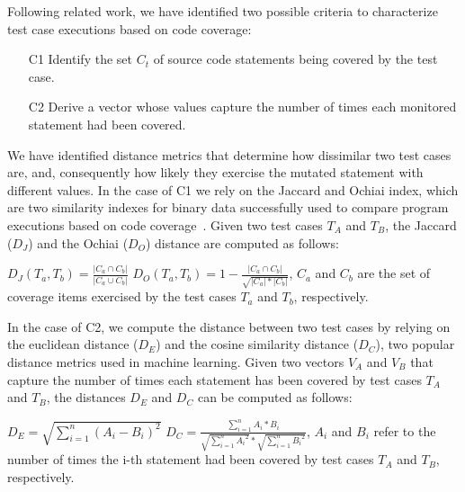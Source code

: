 Following related work, we have identified two possible criteria to characterize test case executions based on code coverage:
\begin{itemize}
\item[C1] Identify the set $C_t$ of source code statements being covered by the test case.
\item[C2] Derive a vector whose values capture the number of times each monitored statement had been covered.
\end{itemize}

We have identified distance metrics that determine how dissimilar two test cases are, and, consequently how likely they exercise the mutated statement with different values. In the case of C1 we rely on the Jaccard and Ochiai index, which are two similarity indexes for binary data successfully used to compare program executions based on code coverage~\cite{Zou:Ochiai:2019,Keller:Jaccard:2017,Briand:2019}. Given two test cases $T_A$ and $T_B$, the Jaccard  ($D_J$) and the Ochiai ($D_O$) distance are computed as follows:

$D_J(T_a,T_b)=\frac{|C_a \cap C_b|}{|C_a \cup C_b|}$ \hspace{5mm} $D_O(T_a,T_b)=1-\frac{|C_a \cap C_b|}{\sqrt{|C_a| * |C_b|}}$, 
$C_a$ and $C_b$ are the set of coverage items exercised by the test cases $T_a$ and $T_b$, respectively.

In the case of C2, we compute the distance between two test cases by relying on the euclidean distance ($D_E$) and the cosine similarity distance ($D_C$), two popular distance metrics used in machine learning. Given two vectors $V_A$ and $V_B$ that capture the number of times each statement has been covered by test cases $T_A$ and $T_B$, the distances $D_E$ and $D_C$ can be computed as follows:

$D_E=\sqrt{\sum_{i=1}^{n}(A_i-B_i)^2}$ 
$D_C= \frac{\sum_{i=1}^{n}A_i*B_i}{\sqrt{\sum_{i=1}^{n}{A_i}^2}*\sqrt{\sum_{i=1}^{n}{B_i}^2}}$,
$A_i$ and $B_i$ refer to the number of times the i-th statement had been covered by test cases $T_A$ and $T_B$, respectively.

